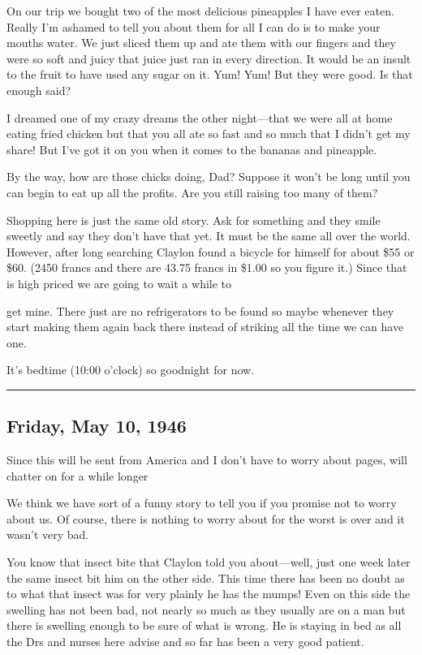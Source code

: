 \documentclass[
]{book}
\begin{document}
On our trip we bought two of the most delicious pineapples I have ever eaten. Really I'm ashamed to tell you about them for all I can do is to make your mouths water. We just sliced them up and ate them with our fingers and they were so soft and juicy that juice just ran in every direction. It would be an insult to the fruit to have used any sugar on it. Yum! Yum! But they were good. Is that enough said?

I dreamed one of my crazy dreams the other night---that we were all at home eating fried chicken but that you all ate so fast and so much that I didn't get my share! But I've got it on you when it comes to the bananas and pineapple.

By the way, how are those chicks doing, Dad? Suppose it won't be long until you can begin to eat up all the profits. Are you still raising too many of them?

Shopping here is just the same old story. Ask for something and they smile sweetly and say they don't have that yet. It must be the same all over the world. However, after long searching Claylon found a bicycle for himself for about \$55 or \$60. (2450 francs and there are 43.75 francs in \$1.00 so you figure it.) Since that is high priced we are going to wait a while to

get mine. There just are no refrigerators to be found so maybe whenever they start making them again back there instead of striking all the time we can have one.

It's bedtime (10:00 o'clock) so goodnight for now.

\begin{center}\rule{0.5\linewidth}{0.5pt}\end{center}

\hypertarget{friday-may-10-1946}{%
\subsection{Friday, May 10, 1946}\label{friday-may-10-1946}}

Since this will be sent from America and I don't have to worry about pages, will chatter on for a while longer

We think we have sort of a funny story to tell you if you promise not to worry about us. Of course, there is nothing to worry about for the worst is over and it wasn't very bad.

You know that insect bite that Claylon told you about---well, just one week later the same insect bit him on the other side. This time there has been no doubt as to what that insect was for very plainly he has the mumps! Even on this side the swelling has not been bad, not nearly so much as they usually are on a man but there is swelling enough to be sure of what is wrong. He is staying in bed as all the Drs and nurses here advise and so far has been a very good patient.
\end{document}
